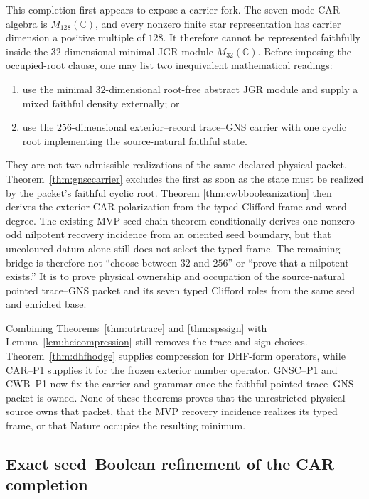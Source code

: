 \documentclass[11pt,a4paper]{article}
\theoremstyle{remark}
\begin{document}
This completion first appears to expose a carrier fork.  The seven-mode CAR
algebra is $M_{128}(\mathbb C)$, and every nonzero finite star representation
has carrier dimension a positive multiple of $128$.  It therefore cannot be
represented faithfully inside the $32$-dimensional minimal JGR module
$M_{32}(\mathbb C)$.  Before imposing the occupied-root clause, one may list
two inequivalent mathematical readings:
\begin{enumerate}
 \item use the minimal $32$-dimensional root-free abstract JGR module and
 supply a mixed faithful density externally; or
 \item use the $256$-dimensional exterior--record trace--GNS carrier with one
 cyclic root implementing the source-natural faithful state.
\end{enumerate}
They are not two admissible realizations of the same declared physical
packet.  Theorem~\ref{thm:gnsccarrier} excludes the first as soon as the state
must be realized by the packet's faithful cyclic root.  Theorem
\ref{thm:cwbbooleanization} then derives the exterior CAR polarization from
the typed Clifford frame and word degree.  The existing MVP seed-chain
theorem conditionally derives one nonzero odd nilpotent recovery incidence
from an oriented seed boundary, but that uncoloured datum alone still does
not select the typed frame.  The remaining bridge is therefore not ``choose
between $32$ and $256$'' or ``prove that a nilpotent exists.''  It is to prove
physical ownership and occupation of the source-natural pointed trace--GNS
packet and its seven typed Clifford roles from the same seed and enriched
base.

Combining Theorems~\ref{thm:utrtrace} and \ref{thm:spssign} with
Lemma~\ref{lem:hcicompression} still removes the trace and sign choices.
Theorem~\ref{thm:dhfhodge} supplies compression for DHF-form operators, while
CAR--P1 supplies it for the frozen exterior number operator.  GNSC--P1 and
CWB--P1 now fix the carrier and grammar once the faithful pointed trace--GNS
packet is owned.  None of these theorems proves that the unrestricted
physical source owns that packet, that the MVP recovery incidence realizes
its typed frame, or that Nature occupies the resulting minimum.

\subsection{Exact seed--Boolean refinement of the CAR completion}
\end{document}

